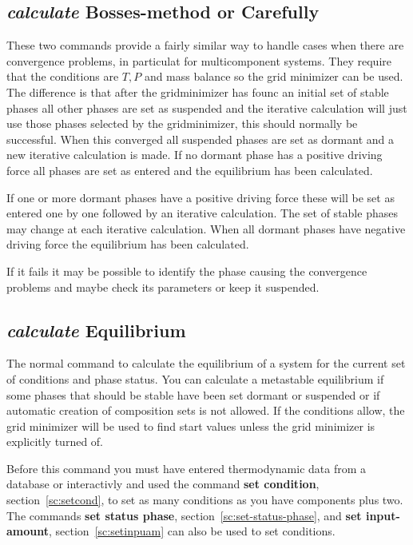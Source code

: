 \documentclass[11pt]{article}
\begin{document}
\subsection{{\em calculate} Bosses-method or Carefully}\label{sc:calcbosse}\label{sc:calccare}

  These two commands provide a fairly similar way to handle cases when
  there are convergence problems, in particulat for multicomponent
  systems.  They require that the conditions are $T, P$ and mass
  balance so the grid minimizer can be used.  The difference is that
  after the gridminimizer has founc an initial set of stable phases
  all other phases are set as suspended and the iterative calculation
  will just use those phases selected by the gridminimizer, this
  should normally be successful.  When this converged all suspended
  phases are set as dormant and a new iterative calculation is made.
  If no dormant phase has a positive driving force all phases are set
  as entered and the equilibrium has been calculated.

  If one or more dormant phases have a positive driving force these
  will be set as entered one by one followed by an iterative
  calculation.  The set of stable phases may change at each iterative
  calculation.  When all dormant phases have negative driving force
  the equilibrium has been calculated.

  If it fails it may be possible to identify the phase causing the
  convergence problems and maybe check its parameters or keep it
  suspended.
  
\hypertarget{Calculate equilibrium}{}
\subsection{{\em calculate} Equilibrium}\label{sc:calceq}

The normal command to calculate the equilibrium of a system for the
current set of conditions and phase status.  You can calculate a
metastable equilibrium if some phases that should be stable have been
set dormant or suspended or if automatic creation of composition sets
is not allowed.  If the conditions allow, the grid minimizer will be
used to find start values unless the grid minimizer is explicitly
turned of.

Before this command you must have entered thermodynamic data from a
database or interactivly and used the command {\bf set condition},
section~\ref{sc:setcond}, to set as many conditions as you have
components plus two.  The commands {\bf set status phase},
section~\ref{sc:set-status-phase}, and {\bf set input-amount},
section~\ref{sc:setinpuam} can also be used to set conditions.
\end{document}
